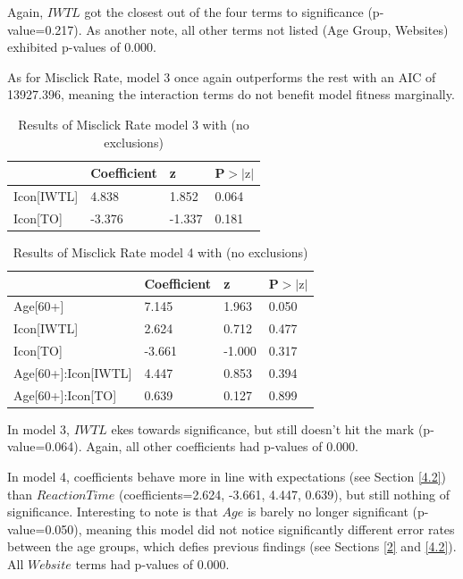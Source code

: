 \documentclass[12pt,twoside]{reedthesis}
\begin{document}
    Again, $IWTL$ got the closest out of the four terms to significance (p-value=0.217). As another note, all other terms not listed (Age Group, Websites) exhibited p-values of 0.000.

    As for Misclick Rate, model 3 once again outperforms the rest with an AIC of 13927.396, meaning the interaction terms do not benefit model fitness marginally.

    \begin{table}[H]
        \centering
        \begin{tabular}{| p{3.5cm} | p{2.5cm} | p{2.5cm} | p{2.5cm} |}
            \hline
            & Coefficient & z & P$>|\text{z}|$\\
            \hline
            Icon[IWTL] & 4.838 &  1.852 & 0.064\\
            \hline
            Icon[TO] & -3.376 & -1.337 & 0.181\\
            \hline
        \end{tabular}
        \caption{Results of Misclick Rate model 3 with (no exclusions)}
        \label{ne_m3_mr}
    \end{table}

    \begin{table}[H]
        \centering
        \begin{tabular}{| p{5cm} | p{2.5cm} | p{2.5cm} | p{2.5cm} |}
            \hline
            & Coefficient & z & P$>|\text{z}|$\\
            \hline
            Age[60+] & 7.145 & 1.963 & 0.050\\
            \hline
            Icon[IWTL] & 2.624 & 0.712 & 0.477\\
            \hline
            Icon[TO] & -3.661 & -1.000 & 0.317\\
            \hline
            Age[60+]:Icon[IWTL] & 4.447 &  0.853 & 0.394\\
            \hline
            Age[60+]:Icon[TO] & 0.639 & 0.127 & 0.899\\
            \hline
        \end{tabular}
        \caption{Results of Misclick Rate model 4 with (no exclusions)}
        \label{ne_m4_mr}
    \end{table}

    In model 3, $IWTL$ ekes towards significance, but still doesn't hit the mark (p-value=0.064). Again, all other coefficients had p-values of 0.000.  
    
    In model 4, coefficients behave more in line with expectations (see Section \ref{4.2}) than $ReactionTime$ (coefficients=2.624, -3.661, 4.447, 0.639), but still nothing of significance. Interesting to note is that $Age$ is barely no longer significant (p-value=0.050), meaning this model did not notice significantly different error rates between the age groups, which defies previous findings (see Sections \ref{2} and \ref{4.2}). All $Website$ terms had p-values of 0.000.
\end{document}
